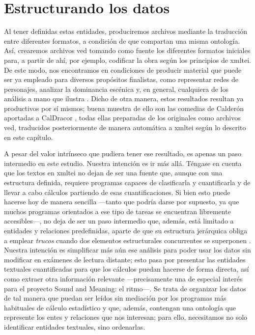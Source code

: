 \section{Estructurando los datos}
Al tener definidas estas entidades, produciremos archivos mediante la traducción entre diferentes formatos, a condición de que compartan una misma ontología. Así, crearemos archivos \ac{ved} tomando como fuente los diferentes formatos iniciales para, a partir de ahí, por ejemplo, codificar la obra según los principios de \ac{xmltei}. De este modo, nos encontramos en condiciones de producir material que puede ser ya empleado para diversos propósitos finalistas, como representar redes de personajes, analizar la dominancia escénica y, en general, cualquiera de los análisis a mano que ilustra . Dicho de otra manera, estos resultados resultan ya productivos por sí mismos; buena muestra de ello son las comedias de Calderón aportadas a CalDracor \parencite{caldracor2022}, todas ellas preparadas de los originales como archivos \ac{ved}, traducidos posteriormente de manera automática a \ac{xmltei} según lo descrito en este capítulo.

A pesar del valor intrínseco que pudiera tener ese resultado, es apenas un paso intermedio en este estudio. Nuestra intención es ir más allá. Téngase en cuenta que los textos en \ac{xmltei} no dejan de ser una fuente que, aunque con una estructura definida, requiere programas capaces de clasificarla y cuantificarla y de llevar a cabo cálculos partiendo de esas cuantificaciones. Si bien esto puede hacerse hoy de manera sencilla —tanto que podría darse por supuesto, ya que muchos programas orientados a ese tipo de tareas se encuentran libremente accesibles—, no deja de ser un paso intermedio que, además, está limitado a entidades y relaciones predefinidas, aparte de que su estructura jerárquica obliga a emplear \textit{trucos} cuando dos elementos estructurales concurrentes se superponen \parencite[692]{tei2022}. Nuestra intención es simplificar más aún ese análisis para poder usar los datos sin modificar en exámenes de lectura distante; esto pasa por presentar las entidades textuales cuantificadas para que los cálculos puedan hacerse de forma directa, así como extraer otra información relevante —precisamente una de especial interés para el proyecto Sound and Meaning: el ritmo—. Se trata de organizar los datos de tal manera que puedan ser leídos sin mediación por los programas más habituales de cálculo estadístico y que, además, contengan una ontología que represente los entes y relaciones que nos interesan; para ello, necesitamos no solo identificar entidades textuales, sino ordenarlas.

